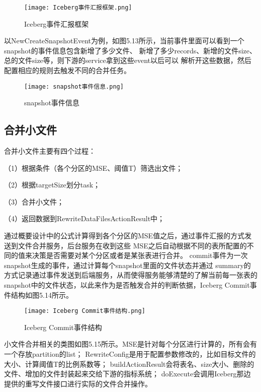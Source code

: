 \begin{figure}[h]
  \centering
  \texttt{[image: Iceberg事件汇报框架.png]}
  \caption{Iceberg事件汇报框架}
  \label{fig:badge}
\end{figure}

以NewCreateSnapshotEvent为例，如图5.13所示，当前事件里面可以看到一个snapshot的事件信息包含新增了多少文件、
新增了多少records、新增的文件size、总的文件size等，则下游的service拿到这些event以后可以
解析开这些数据，然后配置相应的规则去触发不同的合并任务。

\begin{figure}[h]
  \centering
  \texttt{[image: snapshot事件信息.png]}
  \caption{snapshot事件信息}
  \label{fig:badge}
\end{figure}

\subsection{合并小文件}

合并⼩⽂件主要有四个过程：

（1）根据条件（各个分区的MSE、阈值T）筛选出⽂件；

（2）根据targetSize划分task；

（3）合并⼩⽂件；

（4）返回数据到RewriteDataFilesActionResult中；

通过概要设计中的公式计算得到各个分区的MSE值之后，通过事件汇报的方式发送到文件合并服务，后台服务在收到这些
MSE之后自动根据不同的表所配置的不同的值来决策是否需要对某个分区或者是某张表进行合并。
commit事件为一次snapshot生成的事件，通过计算每个snapshot里面的文件状态并通过
summary的方式记录通过事件发送到后端服务，从而使得服务能够清楚的了解当前每一张表的
snapshot中的文件状态，以此来作为是否触发合并的判断依据，Iceberg Commit事件结构如图5.14所示。

\begin{figure}[h]
  \centering
  \texttt{[image: Iceberg Commit事件结构.png]}
  \caption{Iceberg Commit事件结构}
  \label{fig:badge}
\end{figure}

小文件合并相关的类图如图5.15所示。MSE是针对每个分区进行计算的，所有会有一个存放partition的list；
RewriteConfig是用于配置参数修改的，比如目标文件的大小、计算阈值T的比例系数等；
buildActionResult会将表名、size大小、删除的文件、增加的文件封装起来交给下游的指标系统；
doExecute会调用Iceberg那边提供的重写文件接口进行实际的文件合并操作。

